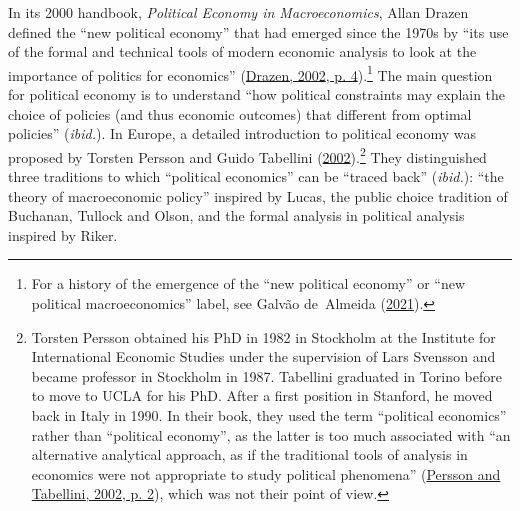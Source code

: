 \documentclass[]{elsarticle} %
\begin{document}
In its 2000 handbook, \emph{Political Economy in Macroeconomics}, Allan
Drazen defined the ``new political economy'' that had emerged since the
1970s by ``its use of the formal and technical tools of modern economic
analysis to look at the importance of politics for economics''
(\protect\hyperlink{ref-drazen2002}{Drazen, 2002, p. 4}).\footnote{For a
  history of the emergence of the ``new political economy'' or ``new
  political macroeconomics'' label, see Galvão de~Almeida
  (\protect\hyperlink{ref-galvaodealmeida2021}{2021}).} The main
question for political economy is to understand ``how political
constraints may explain the choice of policies (and thus economic
outcomes) that different from optimal policies'' (\emph{ibid.}). In
Europe, a detailed introduction to political economy was proposed by
Torsten Persson and Guido Tabellini
(\protect\hyperlink{ref-persson2002}{2002}).\footnote{Torsten Persson
  obtained his PhD in 1982 in Stockholm at the Institute for
  International Economic Studies under the supervision of Lars Svensson
  and became professor in Stockholm in 1987. Tabellini graduated in
  Torino before to move to UCLA for his PhD. After a first position in
  Stanford, he moved back in Italy in 1990. In their book, they used the
  term ``political economics'' rather than ``political economy'', as the
  latter is too much associated with ``an alternative analytical
  approach, as if the traditional tools of analysis in economics were
  not appropriate to study political phenomena''
  (\protect\hyperlink{ref-persson2002}{Persson and Tabellini, 2002, p.
  2}), which was not their point of view.} They distinguished three
traditions to which ``political economics'' can be ``traced back''
(\emph{ibid.}): ``the theory of macroeconomic policy'' inspired by
Lucas, the public choice tradition of Buchanan, Tullock and Olson, and
the formal analysis in political analysis inspired by Riker.
\end{document}
